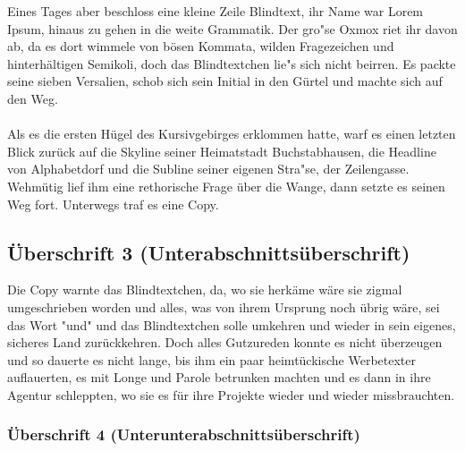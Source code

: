 \documentclass[11pt, rgb]{scrreprt}
\begin{document}
Eines Tages aber beschloss eine kleine Zeile Blindtext, ihr Name war Lorem Ipsum, hinaus zu gehen in die weite Grammatik. Der gro"se Oxmox riet ihr davon ab, da es dort wimmele von bösen Kommata, wilden Fragezeichen und hinterhältigen Semikoli, doch das Blindtextchen lie"s sich nicht beirren. Es packte seine sieben Versalien, schob sich sein Initial in den Gürtel und machte sich auf den Weg.\\
\\
Als es die ersten Hügel des Kursivgebirges erklommen hatte, warf es einen letzten Blick zurück auf die Skyline seiner Heimatstadt Buchstabhausen, die Headline von Alphabetdorf und die Subline seiner eigenen Stra"se, der Zeilengasse. Wehmütig lief ihm eine rethorische Frage über die Wange, dann setzte es seinen Weg fort. Unterwegs traf es eine Copy.

\subsection{Überschrift 3 (Unterabschnittsüberschrift)}

Die Copy warnte das Blindtextchen, da, wo sie herkäme wäre sie zigmal umgeschrieben worden und alles, was von ihrem Ursprung noch übrig wäre, sei das Wort "und" und das Blindtextchen solle umkehren und wieder in sein eigenes, sicheres Land zurückkehren. Doch alles Gutzureden konnte es nicht überzeugen und so dauerte es nicht lange, bis ihm ein paar heimtückische Werbetexter auflauerten, es mit Longe und Parole betrunken machten und es dann in ihre Agentur schleppten, wo sie es für ihre Projekte wieder und wieder missbrauchten.

\subsubsection{Überschrift 4 (Unterunterabschnittsüberschrift)}
\end{document}
